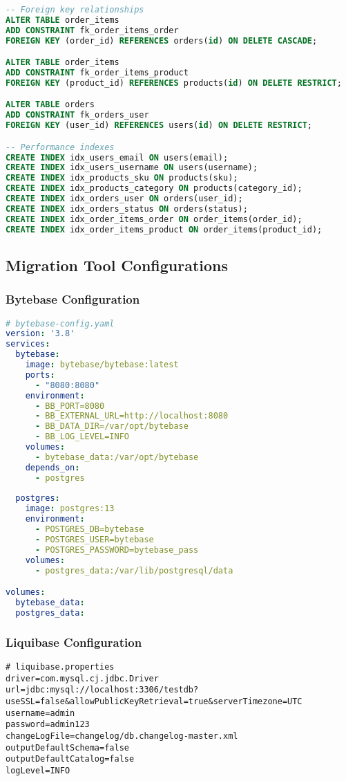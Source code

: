 \begin{lstlisting}[language=SQL, caption=Complete Database Schema]
-- Foreign key relationships
ALTER TABLE order_items 
ADD CONSTRAINT fk_order_items_order 
FOREIGN KEY (order_id) REFERENCES orders(id) ON DELETE CASCADE;

ALTER TABLE order_items 
ADD CONSTRAINT fk_order_items_product 
FOREIGN KEY (product_id) REFERENCES products(id) ON DELETE RESTRICT;

ALTER TABLE orders 
ADD CONSTRAINT fk_orders_user 
FOREIGN KEY (user_id) REFERENCES users(id) ON DELETE RESTRICT;

-- Performance indexes
CREATE INDEX idx_users_email ON users(email);
CREATE INDEX idx_users_username ON users(username);
CREATE INDEX idx_products_sku ON products(sku);
CREATE INDEX idx_products_category ON products(category_id);
CREATE INDEX idx_orders_user ON orders(user_id);
CREATE INDEX idx_orders_status ON orders(status);
CREATE INDEX idx_order_items_order ON order_items(order_id);
CREATE INDEX idx_order_items_product ON order_items(product_id);
\end{lstlisting}

\subsection{Migration Tool Configurations}

\subsubsection{Bytebase Configuration}
\begin{lstlisting}[language=YAML, caption=Bytebase Configuration]
# bytebase-config.yaml
version: '3.8'
services:
  bytebase:
    image: bytebase/bytebase:latest
    ports:
      - "8080:8080"
    environment:
      - BB_PORT=8080
      - BB_EXTERNAL_URL=http://localhost:8080
      - BB_DATA_DIR=/var/opt/bytebase
      - BB_LOG_LEVEL=INFO
    volumes:
      - bytebase_data:/var/opt/bytebase
    depends_on:
      - postgres
      
  postgres:
    image: postgres:13
    environment:
      - POSTGRES_DB=bytebase
      - POSTGRES_USER=bytebase
      - POSTGRES_PASSWORD=bytebase_pass
    volumes:
      - postgres_data:/var/lib/postgresql/data

volumes:
  bytebase_data:
  postgres_data:
\end{lstlisting}

\subsubsection{Liquibase Configuration}
\begin{lstlisting}[language=Properties, caption=Liquibase Properties]
# liquibase.properties
driver=com.mysql.cj.jdbc.Driver
url=jdbc:mysql://localhost:3306/testdb?useSSL=false&allowPublicKeyRetrieval=true&serverTimezone=UTC
username=admin
password=admin123
changeLogFile=changelog/db.changelog-master.xml
outputDefaultSchema=false
outputDefaultCatalog=false
logLevel=INFO
\end{lstlisting}

